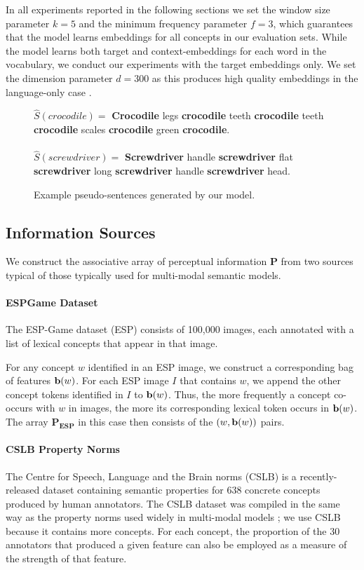 \documentclass[11pt]{article}
\begin{document}
In all experiments reported in the following sections we set the window size parameter \(k = 5\) and the minimum frequency parameter \(f = 3\), which guarantees that the model learns embeddings for all concepts in our evaluation sets. While the model learns both target and context-embeddings for each word in the vocabulary, we conduct our experiments with the target embeddings only. We set the dimension parameter \(d = 300 \) as this produces high quality embeddings in the language-only case \cite{mikolov2013efficient}. 

\begin{figure} \(\hat{S}(crocodile) =\)\small{ {\bf Crocodile} legs {\bf crocodile} teeth {\bf crocodile} teeth {\bf crocodile} scales {\bf crocodile} green {\bf crocodile}. \\ \\ \(\hat{S}(screwdriver)=\) { \bf Screwdriver} handle {\bf screwdriver} flat  {\bf screwdriver} long {\bf screwdriver}  handle {\bf screwdriver}  head. } \caption{Example pseudo-sentences generated by our model.}\end{figure}

\subsection{Information Sources}

We construct the associative array of perceptual information \(\mathbf{P}\) from two sources typical of those typically used for multi-modal semantic models.

\paragraph{ESPGame Dataset} The ESP-Game dataset (ESP) \cite{von2004labeling} consists of 100,000 images, each annotated with a list of lexical concepts that appear in that image.  

For any concept \(w\) identified in an ESP image, we construct a corresponding bag of features \({\bf b}(w)\). For each ESP image \(I\) that contains \(w\), we append the other concept tokens identified in \(I\) to \({\bf b}(w)\). Thus, the more frequently a concept co-occurs with \(w\) in images, the more its corresponding lexical token occurs in \({\bf b}(w)\). The array \(\mathbf{P_{ESP}}\) in this case then consists of the  \( (w,  {\bf b}(w) ) \) pairs.

\paragraph{CSLB Property Norms} The Centre for Speech, Language and the Brain norms (CSLB) \cite{devereux2013centre} is a recently-released dataset containing semantic properties for 638 concrete concepts produced by human annotators. The CSLB dataset was compiled in the same way as the  property norms used widely in multi-modal models \cite{silberer2012grounded,rollermultimodal}; we use CSLB because it contains more concepts. For each concept, the proportion of the 30 annotators that produced a given feature can also be employed as a measure of the strength of that feature.
\end{document}

